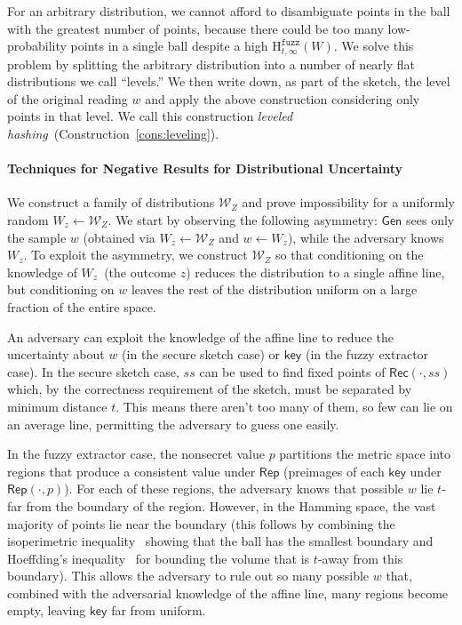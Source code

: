 \documentclass[11pt]{article}
\newcommand{\consref}[1]{\mbox{Construction~\ref{#1}}}
\newcommand{\class}[1]{{\ensuremath{\mathsf{#1}}}}
\newcommand{\key}{\ensuremath{\class{key}}\xspace}
\newcommand{\gen}{\ensuremath{\class{Gen}}\xspace}
\newcommand{\rep}{\ensuremath{\class{Rep}}\xspace}
\newcommand{\rec}{\ensuremath{\class{Rec}}\xspace}
\newcommand{\Hfuzz}{\mathrm{H}^{\mathtt{fuzz}}_{t,\infty}}
\begin{document}
For an arbitrary distribution, we cannot afford to disambiguate points in the ball with the greatest number of points, because there could be too many low-probability points in a single ball despite a high $\Hfuzz(W)$.  We solve this problem by splitting the arbitrary distribution into a number of nearly flat distributions we call ``levels.''  We then write down, as part of the sketch, the level of the original reading $w$ and apply the above construction considering only points in that level.  We call this construction \emph{leveled hashing}~(\consref{cons:leveling}).

\paragraph{Techniques for Negative Results for Distributional Uncertainty}
We construct a family of distributions $\mathcal{W}_Z$ and prove impossibility for a uniformly random $W_z \leftarrow \mathcal{W}_Z$.
We start by observing the following asymmetry: $\gen$  sees only the sample $w$ (obtained via $W_z\leftarrow \mathcal{W}_Z$ and $w\leftarrow W_z$), while
the adversary knows $W_z$.   To exploit the asymmetry, we construct $\mathcal{W}_Z$ so that conditioning on the knowledge of $W_z$~(the outcome $z$) reduces the distribution to a single affine line, but conditioning on $w$ leaves the rest of the distribution uniform on a large fraction of the entire space.

An adversary can exploit the knowledge of the affine line to reduce the uncertainty about $w$ (in the secure sketch case) or $\key$ (in the fuzzy extractor case). 
In the secure sketch case, $ss$ can be used to find fixed points of $\rec(\cdot, ss)$ which, by the correctness requirement of the sketch, must be separated by minimum distance $t$. This means there aren't too many of them, so few can lie on an average line, permitting the adversary to guess one easily.

In the fuzzy extractor case, the nonsecret value $p$ partitions the metric space into regions that produce a consistent value under $\rep$ (preimages of each $\key$ under $\rep(\cdot, p)$).  For each of these regions, the adversary knows that possible $w$ lie $t$-far from the boundary of the region.  However, in the Hamming space, the vast majority of points lie near the boundary (this follows by combining the isoperimetric inequality~\cite{harper1966optimal} showing that the ball has the smallest boundary and Hoeffding's inequality~\cite{hoeffding1963probability} for bounding the volume that is $t$-away from this boundary).  This allows the adversary to rule out so many possible $w$ that, combined with the adversarial knowledge of the affine line, many regions become empty, leaving $\key$ far from uniform.
\end{document}
